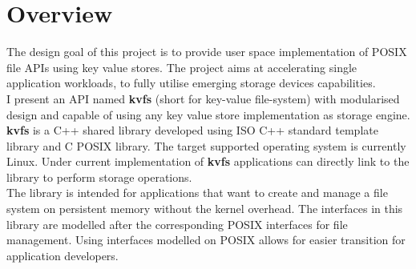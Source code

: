 \documentclass[bsc,frontabs,twoside,singlespacing,parskip,deptreport]{infthesis}     %
\begin{document}
\chapter{Overview} \label{proj_overview}
The design goal of this project is to provide user space implementation of POSIX file APIs using key value stores. The project aims at accelerating single application workloads, to fully utilise emerging storage devices capabilities. 
\\ I present an API named {\bf kvfs} (short for key-value file-system) with modularised design and capable of using any key value store implementation as storage engine.
\\ {\bf kvfs} is a C++ shared library developed using ISO C++ standard template library and C POSIX library.
The target supported operating system is currently Linux. Under current implementation of {\bf kvfs} applications can directly link to the library to perform storage operations.
\\ The library is intended for applications that want to create and manage a file system on persistent memory without the kernel overhead. The interfaces in this library are modelled after the corresponding POSIX interfaces for file management. Using interfaces modelled on POSIX allows for easier transition for application developers.
\end{document}
